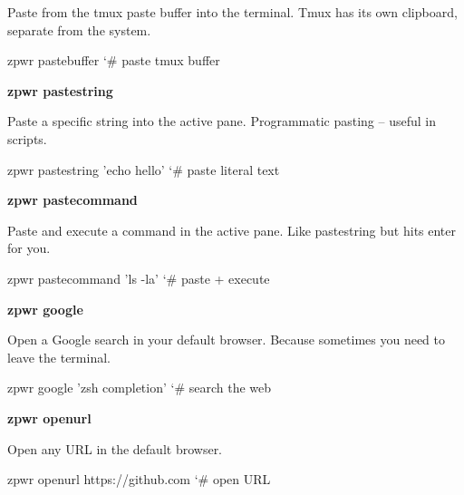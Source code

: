 \documentclass[11pt,a4paper,twoside]{book}
\begin{document}
Paste from the tmux paste buffer into the terminal. Tmux has its own clipboard, separate from the system.

\begin{codebox}
\color{neongreen}zpwr pastebuffer            {\char`\#} paste tmux buffer\\
\end{codebox}


\vspace{12pt}
{\bfseries\color{neonyellow} zpwr pastestring}\vspace{4pt}

Paste a specific string into the active pane. Programmatic pasting -- useful in scripts.

\begin{codebox}
\color{neongreen}zpwr pastestring 'echo hello' {\char`\#} paste literal text\\
\end{codebox}


\vspace{12pt}
{\bfseries\color{neonyellow} zpwr pastecommand}\vspace{4pt}

Paste and execute a command in the active pane. Like pastestring but hits enter for you.

\begin{codebox}
\color{neongreen}zpwr pastecommand 'ls -la'  {\char`\#} paste + execute\\
\end{codebox}


\vspace{12pt}
{\bfseries\color{neonyellow} zpwr google}\vspace{4pt}

Open a Google search in your default browser. Because sometimes you need to leave the terminal.

\begin{codebox}
\color{neongreen}zpwr google 'zsh completion' {\char`\#} search the web\\
\end{codebox}


\vspace{12pt}
{\bfseries\color{neonyellow} zpwr openurl}\vspace{4pt}

Open any URL in the default browser.

\begin{codebox}
\color{neongreen}zpwr openurl https://github.com {\char`\#} open URL\\
\end{codebox}
\end{document}

